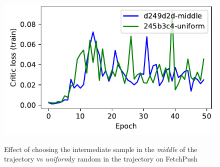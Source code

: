 \begin{figure}
  \includegraphics[width=\frac\columnwidth]{media/res/d249d2d-c9bfa98b-FetchPush-v1-fwrl-future/train/critic_loss.pdf}%
  \label{fig:}%
  \caption{Effect of choosing the intermediate sample in the \emph{middle} of the
    trajectory vs \emph{uniform}ly random in the trajectory on FetchPush}%
\end{figure}%
% 


%
%
%
%
%
